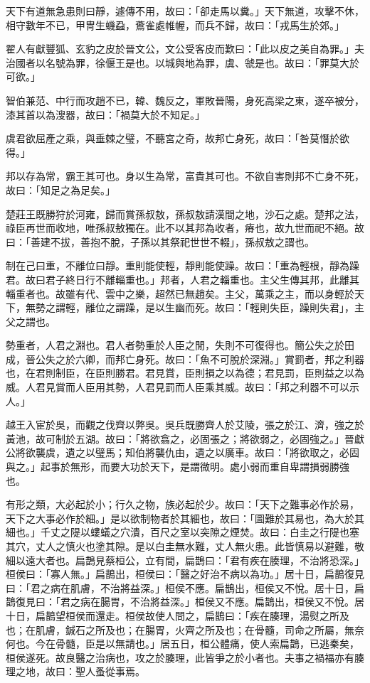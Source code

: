 
\begin{pinyinscope}
天下有道無急患則曰靜，遽傳不用，故曰：「卻走馬以糞。」天下無道，攻擊不休，相守數年不已，甲冑生蟣蝨，鷰雀處帷幄，而兵不歸，故曰：「戎馬生於郊。」

翟人有獻豐狐、玄豹之皮於晉文公，文公受客皮而歎曰：「此以皮之美自為罪。」夫治國者以名號為罪，徐偃王是也。以城與地為罪，虞、虢是也。故曰：「罪莫大於可欲。」

智伯兼范、中行而攻趙不已，韓、魏反之，軍敗晉陽，身死高梁之東，遂卒被分，漆其首以為溲器，故曰：「禍莫大於不知足。」

虞君欲屈產之乘，與垂棘之璧，不聽宮之奇，故邦亡身死，故曰：「咎莫憯於欲得。」

邦以存為常，霸王其可也。身以生為常，富貴其可也。不欲自害則邦不亡身不死，故曰：「知足之為足矣。」

楚莊王既勝狩於河雍，歸而賞孫叔敖，孫叔敖請漢間之地，沙石之處。楚邦之法，祿臣再世而收地，唯孫叔敖獨在。此不以其邦為收者，瘠也，故九世而祀不絕。故曰：「善建不拔，善抱不脫，子孫以其祭祀世世不輟」，孫叔敖之謂也。

制在己曰重，不離位曰靜。重則能使輕，靜則能使躁。故曰：「重為輕根，靜為躁君。故曰君子終日行不離輜重也。」邦者，人君之輜重也。主父生傳其邦，此離其輜重者也。故雖有代、雲中之樂，超然已無趙矣。主父，萬乘之主，而以身輕於天下，無勢之謂輕，離位之謂躁，是以生幽而死。故曰：「輕則失臣，躁則失君」，主父之謂也。

勢重者，人君之淵也。君人者勢重於人臣之閒，失則不可復得也。簡公失之於田成，晉公失之於六卿，而邦亡身死。故曰：「魚不可脫於深淵。」賞罰者，邦之利器也，在君則制臣，在臣則勝君。君見賞，臣則損之以為德；君見罰，臣則益之以為威。人君見賞而人臣用其勢，人君見罰而人臣乘其威。故曰：「邦之利器不可以示人。」

越王入宦於吳，而觀之伐齊以弊吳。吳兵既勝齊人於艾陵，張之於江、濟，強之於黃池，故可制於五湖。故曰：「將欲翕之，必固張之；將欲弱之，必固強之。」晉獻公將欲襲虞，遺之以璧馬；知伯將襲仇由，遺之以廣車。故曰：「將欲取之，必固與之。」起事於無形，而要大功於天下，是謂微明。處小弱而重自卑謂損弱勝強也。

有形之類，大必起於小；行久之物，族必起於少。故曰：「天下之難事必作於易，天下之大事必作於細。」是以欲制物者於其細也，故曰：「圖難於其易也，為大於其細也。」千丈之隄以螻蟻之穴潰，百尺之室以突隙之煙焚。故曰：白圭之行隄也塞其穴，丈人之慎火也塗其隙。是以白圭無水難，丈人無火患。此皆慎易以避難，敬細以遠大者也。扁鵲見蔡桓公，立有間，扁鵲曰：「君有疾在腠理，不治將恐深。」桓侯曰：「寡人無。」扁鵲出，桓侯曰：「醫之好治不病以為功。」居十日，扁鵲復見曰：「君之病在肌膚，不治將益深。」桓侯不應。扁鵲出，桓侯又不悅。居十日，扁鵲復見曰：「君之病在腸胃，不治將益深。」桓侯又不應。扁鵲出，桓侯又不悅。居十日，扁鵲望桓侯而還走。桓侯故使人問之，扁鵲曰：「疾在腠理，湯熨之所及也；在肌膚，鍼石之所及也；在腸胃，火齊之所及也；在骨髓，司命之所屬，無奈何也。今在骨髓，臣是以無請也。」居五日，桓公體痛，使人索扁鵲，已逃秦矣，桓侯遂死。故良醫之治病也，攻之於腠理，此皆爭之於小者也。夫事之禍福亦有腠理之地，故曰：聖人蚤從事焉。


\end{pinyinscope}
